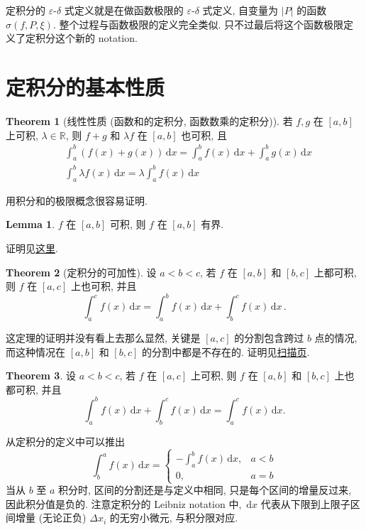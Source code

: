\documentclass{book}
\newcommand{\dd}{\,\mathrm{d}}
\newcommand{\abs}[1]{\left\lvert #1 \right\rvert}
\newcommand{\R}{\mathbb{R}}
\numberwithin{equation}{section}
\numberwithin{figure}{section}
\theoremstyle{definition}
\newtheorem{theorem}{Theorem}[section]
\newtheorem{lemma}{Lemma}[section]
\begin{document}
定积分的 $\varepsilon$-$\delta$ 式定义就是在做函数极限的 $\varepsilon$-$\delta$ 式定义, 自变量为 $\abs{P}$ 的函数 $\sigma(f,P,\xi)$. 整个过程与函数极限的定义完全类似. 只不过最后将这个函数极限定义了定积分这个新的 notation.
\section{定积分的基本性质}
\begin{theorem}[线性性质 (函数和的定积分, 函数数乘的定积分)]
  若 $f,g$ 在 $[a,b]$ 上可积, $\lambda\in\R$, 则 $f+g$ 和 $\lambda f$ 在 $[a,b]$ 也可积, 且
  \begin{align*}
    &\int_{a}^{b} (f(x)+g(x)) \dd x=\int_{a}^{b} f(x) \dd x+\int_{a}^{b} g(x) \dd x\\
    &\int_{a}^{b} \lambda f(x) \dd x=\lambda\int_{a}^{b} f(x) \dd x
  \end{align*}
\end{theorem}
用积分和的极限概念很容易证明.

\begin{lemma}
  $f$ 在 $[a,b]$ 可积, 则 $f$ 在 $[a,b]$ 有界.
\end{lemma}
证明见\hyperlink{proof:IntegratableBoundary}{这里}.

\begin{theorem}[定积分的可加性]
  设 $a<b<c$, 若 $f$ 在 $[a,b]$ 和 $[b,c]$ 上都可积, 则 $f$ 在 $[a,c]$ 上也可积, 并且
  \begin{equation*}
    \int_{a}^{c} f(x) \dd x=\int_{a}^{b} f(x) \dd x+\int_{b}^{c} f(x) \dd x\,.
  \end{equation*}
\end{theorem}
这定理的证明并没有看上去那么显然, 关键是 $[a,c]$ 的分割包含跨过 $b$ 点的情况, 而这种情况在 $[a,b]$ 和 $[b,c]$ 的分割中都是不存在的.
证明见\hyperlink{scan:IntegratableHasBoundary}{扫描页}.

\begin{theorem}
  设 $a<b<c$, 若 $f$ 在 $[a,c]$ 上可积, 则 $f$ 在 $[a,b]$ 和 $[b,c]$ 上也都可积, 并且
  \begin{equation*}
    \int_{a}^{b} f(x) \dd x+\int_{b}^{c} f(x) \dd x=\int_{a}^{c} f(x) \dd x.
  \end{equation*}
\end{theorem}

从定积分的定义中可以推出
  \begin{equation*}
    \int_{b}^{a} f(x) \dd x=
    \begin{cases}
      -\int_{a}^{b} f(x) \dd x,&a<b\\
      0,&a=b
    \end{cases}
  \end{equation*}
当从 $b$ 至 $a$ 积分时, 区间的分割还是与定义中相同, 只是每个区间的增量反过来, 因此积分值是负的.
注意定积分的 Leibniz notation 中, $\dd x$ 代表从下限到上限子区间增量 (无论正负) $\Delta x_i$ 的无穷小微元, 与积分限对应.
\end{document}
